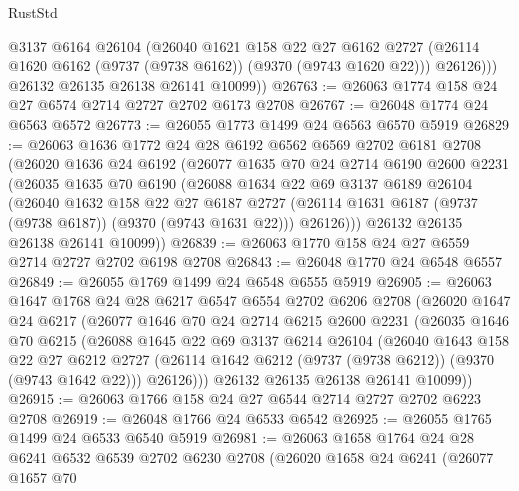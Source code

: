 \begin{lexlean}{RustStd}
\begin{coremodule}
{\begin{coremodule}
{{{{{{{{{{{{{{{{{{{{{{{{{{{{{{{{{{{{{{{            @3137
            @6164
            @26104
            (@26040
              @1621
              @158
              @22
              @27
              @6162
              @2727
              (@26114 @1620 @6162 (@9737 (@9738 @6162)) (@9370 (@9743 @1620 @22)))
              @26126)))
        @26132
        @26135
        @26138
        @26141
        @10099))
@26763 := @26063 @1774 @158 @24 @27 @6574 @2714 @2727 @2702 @6173 @2708
@26767 := @26048 @1774 @24 @6563 @6572
@26773 := @26055 @1773 @1499 @24 @6563 @6570 @5919
@26829 := @26063
    @1636
    @1772
    @24
    @28
    @6192
    @6562
    @6569
    @2702
    @6181
    @2708
    (@26020
      @1636
      @24
      @6192
      (@26077
        @1635
        @70
        @24
        @2714
        @6190
        @2600
        @2231
        (@26035
          @1635
          @70
          @6190
          (@26088
            @1634
            @22
            @69
            @3137
            @6189
            @26104
            (@26040
              @1632
              @158
              @22
              @27
              @6187
              @2727
              (@26114 @1631 @6187 (@9737 (@9738 @6187)) (@9370 (@9743 @1631 @22)))
              @26126)))
        @26132
        @26135
        @26138
        @26141
        @10099))
@26839 := @26063 @1770 @158 @24 @27 @6559 @2714 @2727 @2702 @6198 @2708
@26843 := @26048 @1770 @24 @6548 @6557
@26849 := @26055 @1769 @1499 @24 @6548 @6555 @5919
@26905 := @26063
    @1647
    @1768
    @24
    @28
    @6217
    @6547
    @6554
    @2702
    @6206
    @2708
    (@26020
      @1647
      @24
      @6217
      (@26077
        @1646
        @70
        @24
        @2714
        @6215
        @2600
        @2231
        (@26035
          @1646
          @70
          @6215
          (@26088
            @1645
            @22
            @69
            @3137
            @6214
            @26104
            (@26040
              @1643
              @158
              @22
              @27
              @6212
              @2727
              (@26114 @1642 @6212 (@9737 (@9738 @6212)) (@9370 (@9743 @1642 @22)))
              @26126)))
        @26132
        @26135
        @26138
        @26141
        @10099))
@26915 := @26063 @1766 @158 @24 @27 @6544 @2714 @2727 @2702 @6223 @2708
@26919 := @26048 @1766 @24 @6533 @6542
@26925 := @26055 @1765 @1499 @24 @6533 @6540 @5919
@26981 := @26063
    @1658
    @1764
    @24
    @28
    @6241
    @6532
    @6539
    @2702
    @6230
    @2708
    (@26020
      @1658
      @24
      @6241
      (@26077
        @1657
        @70
}}}}}}}}}}}}}}}}}}}}}}}}}}}}}}}}}}}}}}}
\end{coremodule}}
\end{coremodule}
\end{lexlean}
